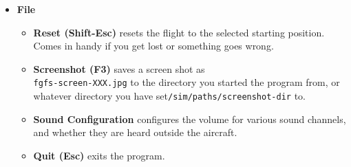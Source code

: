 \begin{itemize}
 \item \textbf{File}
 \begin{itemize}
 \item \textbf{Reset (Shift-Esc)} resets the flight to the selected starting
position. Comes in handy if you get lost or something goes wrong.
  \item \textbf{Screenshot (F3)} saves a screen shot as \\
\texttt{fgfs-screen-XXX.jpg} to the directory you started the program from, or whatever
directory you have set\texttt{/sim/paths/screenshot-dir} to.
  \item \textbf{Sound Configuration} configures the volume for various sound
channels, and whether they are heard outside the aircraft.
  \item \textbf{Quit (Esc)} exits the program.
 \end{itemize}


\end{itemize}
